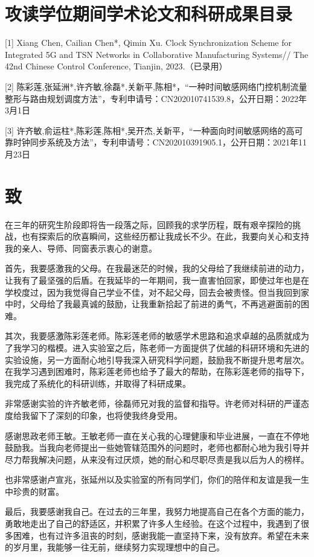 \documentclass[UTF8,a4paper,12pt]{ctexart}
\numberwithin{equation}{section}
\begin{document}
\newpage

\newpage
{}

\section*{攻读学位期间学术论文和科研成果目录}

[1] Xiang Chen, Cailian Chen*, Qimin Xu.
Clock Synchronization Scheme for Integrated 5G and TSN Networks in Collaborative Manufacturing Systems//
The 42nd Chinese Control Conference, Tianjin, 2023.（已录用）

[2] 陈彩莲,张延洲*,许齐敏,徐磊*,关新平,陈相*，“一种时间敏感网络门控机制流量整形与路由规划调度方法”，专利申请号：CN202010741539.8，公开日期：2022年3月1日

[3] 许齐敏,俞运柱*,陈彩莲,陈相*,吴开杰,关新平，“一种面向时间敏感网络的高可靠时钟同步系统及方法”，专利申请号：CN202010391905.1，公开日期：2021年11月23日

\newpage
{}

\section*{致}
\hspace{8mm}
在三年的研究生阶段即将告一段落之际，回顾我的求学历程，既有艰辛探险的挑战，也有探索后的欣喜瞬间，这些经历都让我成长不少。在此，我要向关心和支持我的亲人、导师、同窗表示衷心的谢意。

首先，我要感激我的父母。在我最迷茫的时候，我的父母给了我继续前进的动力，让我有了最坚强的后盾。在我延毕的一年期间，我一直害怕回家，即使过年也是在学校度过，因为我觉得自己学业不佳，对不起父母，回去会被责怪。但当我回到家中时，父母给了我最真诚的鼓励，让我重新拾起了前进的勇气，不再逃避面前的困难。

其次，我要感激陈彩莲老师。陈彩莲老师的敏感学术思路和追求卓越的品质就成为了我学习的楷模。进入实验室之后，陈老师一方面提供了优越的科研环境和先进的实验设施，另一方面耐心地引导我深入研究科学问题，鼓励我不断提升思考层次。在我学习遇到困难时，陈彩莲老师也给予了最大的帮助，在陈彩莲老师的指导下，我完成了系统化的科研训练，并取得了科研成果。

非常感谢实验的许齐敏老师，徐磊师兄对我的监督和指导。许老师对科研的严谨态度给我留下了深刻的印象，也将使我终身受用。

感谢思政老师王敏。王敏老师一直在关心我的心理健康和毕业进展，一直在不停地鼓励我。当我向老师提出一些她管辖范围外的问题时，老师也都耐心地为我引导并尽力帮我解决问题，从来没有过厌烦，她的耐心和尽职尽责是我以后为人的榜样。

也非常感谢卢宣兆，张延州以及实验室的所有同学们，你们的陪伴和友谊是我一生中珍贵的财富。

最后，我要感谢我自己。在过去的三年里，我努力地提高自己在各个方面的能力，勇敢地走出了自己的舒适区，并积累了许多人生经验。在这个过程中，我遇到了很多困难，也有过许多沮丧的时刻，感谢我能一直坚持下来，没有放弃。希望在未来的岁月里，我能够一往无前，继续努力实现理想中的自己。
\end{document}
